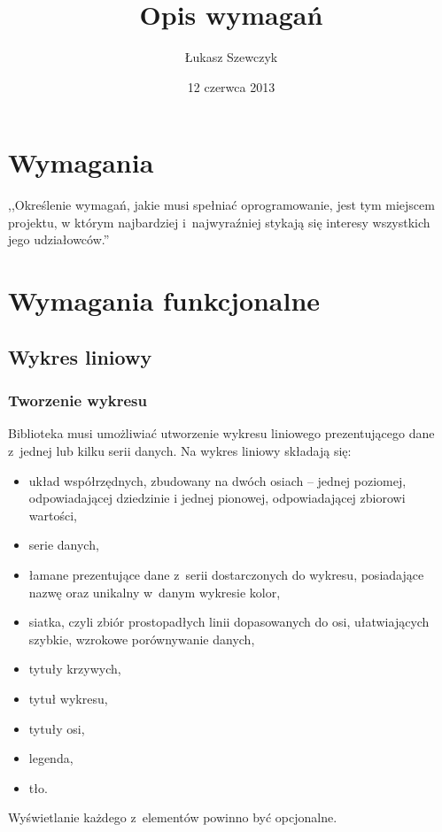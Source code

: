 \documentclass[11pt,twoside,a4paper,final]{article}
\begin{document}
\date{12 czerwca 2013}
\title{Opis wymagań}

\author{Łukasz Szewczyk}

\maketitle

\section{Wymagania}
,,Określenie wymagań, jakie musi spełniać oprogramowanie, jest tym miejscem projektu, w którym najbardziej i~najwyraźniej stykają się interesy wszystkich jego udziałowców.''~\cite{sacha-wymagania}

\section{Wymagania funkcjonalne}
\subsection{Wykres liniowy}
\subsubsection{Tworzenie wykresu}
Biblioteka musi umożliwiać utworzenie wykresu liniowego prezentującego dane z~jednej lub kilku serii danych. Na wykres liniowy składają się:
\begin{itemize}
\item{układ współrzędnych, zbudowany na dwóch osiach -- jednej poziomej, odpowiadającej dziedzinie i jednej pionowej, odpowiadającej zbiorowi wartości,}
\item{serie danych,}
\item{łamane prezentujące dane z~serii dostarczonych do wykresu, posiadające nazwę oraz unikalny w~danym wykresie kolor,}
\item{siatka, czyli zbiór prostopadłych linii dopasowanych do osi, ułatwiających szybkie, wzrokowe porównywanie danych,}
\item{tytuły krzywych,}
\item{tytuł wykresu,}
\item{tytuły osi,}
\item{legenda,}
\item{tło.}
\end{itemize}

Wyświetlanie każdego z~elementów powinno być opcjonalne. 
\end{document}
